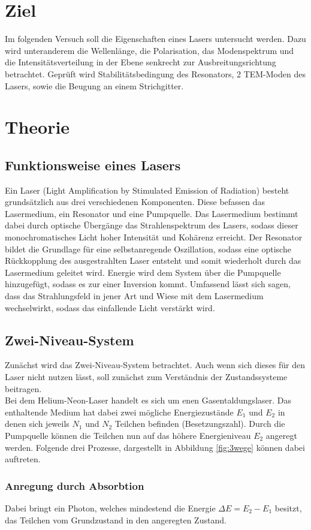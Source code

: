 \section*{Ziel}
Im folgenden Versuch soll die Eigenschaften eines Lasers untersucht werden. 
Dazu wird unteranderem die Wellenlänge, die Polarisation, das Modenspektrum und die Intensitätsverteilung in der Ebene senkrecht zur Ausbreitungsrichtung betrachtet.
Geprüft wird Stabilitätsbedingung des Resonators, 2 TEM-Moden des Lasers, sowie die Beugung an einem Strichgitter.
\section{Theorie}
\subsection{Funktionsweise eines Lasers}
Ein Laser (Light Amplification by Stimulated Emission of Radiation) besteht grundsätzlich aus drei verschiedenen
Komponenten. Diese befassen das Lasermedium, ein Resonator und eine Pumpquelle. Das Lasermedium bestimmt dabei durch optische Übergänge
das Strahlenspektrum des Lasers, sodass dieser monochromatisches Licht hoher Intensität und Kohärenz erreicht.
Der Resonator bildet die Grundlage für eine selbstanregende Oszillation, sodass eine optische Rückkopplung des ausgestrahlten Laser entsteht und somit wiederholt
durch das Lasermedium geleitet wird. Energie wird dem System über die Pumpquelle hinzugefügt, sodass es zur einer Inversion kommt.
Umfassend lässt sich sagen, dass das Strahlungsfeld in jener Art und Wiese mit dem Lasermedium wechselwirkt, sodass das einfallende Licht verstärkt wird.
\subsection{Zwei-Niveau-System}
Zunächst wird das Zwei-Niveau-System betrachtet. Auch wenn sich dieses für den Laser nicht nutzen lässt, soll zunächst zum
Verständnis der Zustandssysteme beitragen.\\
Bei dem Helium-Neon-Laser handelt es sich um enen Gasentaldungslaser. Das enthaltende Medium hat dabei
zwei mögliche Energiezustände $E_1$ und $E_2$ in denen sich jeweils $N_1$ und $N_2$ Teilchen befinden (Besetzungszahl).
Durch die Pumpquelle können die Teilchen nun auf das höhere Energieniveau $E_2$ angeregt werden.
Folgende drei Prozesse, dargestellt in Abbildung \ref{fig:3wege} können dabei auftreten.
\subsubsection*{Anregung durch Absorbtion}
Dabei bringt ein Photon, welches mindestend die Energie $\Delta E=E_2-E_1$ besitzt, das Teilchen vom Grundzustand in den angeregten Zustand.
